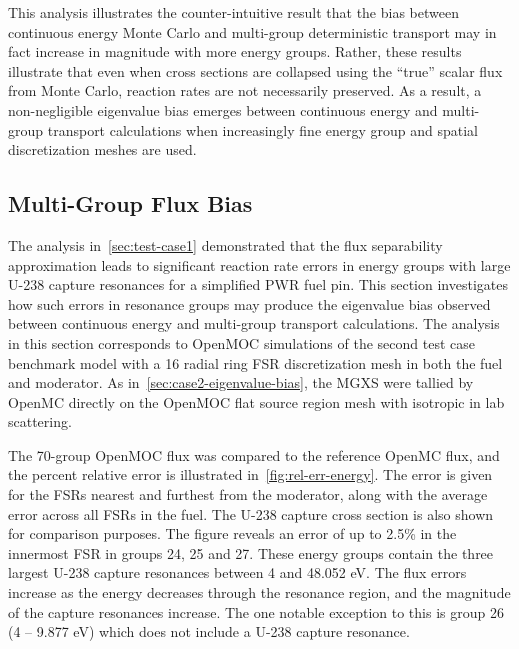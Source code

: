 This analysis illustrates the counter-intuitive result that the bias between continuous energy Monte Carlo and multi-group deterministic transport may in fact increase in magnitude with more energy groups. Rather, these results illustrate that even when cross sections are collapsed using the ``true'' scalar flux from Monte Carlo, reaction rates are not necessarily preserved. As a result, a non-negligible eigenvalue bias emerges between continuous energy and multi-group transport calculations when increasingly fine energy group and spatial discretization meshes are used.



\subsection{Multi-Group Flux Bias}
\label{sec:case2-flux-bias}

The analysis in~\autoref{sec:test-case1} demonstrated that the flux separability approximation leads to significant reaction rate errors in energy groups with large U-238 capture resonances for a simplified PWR fuel pin. This section investigates how such errors in resonance groups may produce the eigenvalue bias observed between continuous energy and multi-group transport calculations. The analysis in this section corresponds to OpenMOC simulations of the second test case benchmark model with a 16 radial ring FSR discretization mesh in both the fuel and moderator. As in~\autoref{sec:case2-eigenvalue-bias}, the MGXS were tallied by OpenMC directly on the OpenMOC flat source region mesh with isotropic in lab scattering.

The 70-group OpenMOC flux was compared to the reference OpenMC flux, and the percent relative error is illustrated in~\autoref{fig:rel-err-energy}. The error is given for the FSRs nearest and furthest from the moderator, along with the average error across all FSRs in the fuel. The U-238 capture cross section is also shown for comparison purposes. The figure reveals an error of up to 2.5\% in the innermost FSR in groups 24, 25 and 27. These energy groups contain the three largest U-238 capture resonances between 4 and 48.052 eV. The flux errors increase as the energy decreases through the resonance region, and the magnitude of the capture resonances increase. The one notable exception to this is group 26 (4 -- 9.877 eV) which does not include a U-238 capture resonance.

